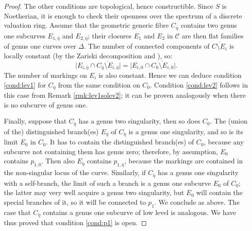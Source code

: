\documentclass{compositio}
\newcommand{\dvr}{\Delta}
\theoremstyle{plain}
\theoremstyle{definition}
\theoremstyle{remark}
\begin{document}
\begin{proof}
 The other conditions are topological, hence constructible. Since $S$ is Noetherian, it is enough to check their openness over the spectrum of a discrete valuation ring. Assume that the geometric generic fibre $C_{\bar\eta}$ contains two genus one subcurves $E_{1,\bar\eta}$ and $E_{2,\bar\eta}$; their closures $E_1$ and $E_2$ in $\mathcal C$ are then flat families of genus one curves over $\dvr$. %
 The number of connected components of $\overline {C\setminus E_i}$ is locally constant (by the Zariski decomposition and \cite[\href{https://stacks.math.columbia.edu/tag/0E0D}{Tag 0E0D}]{stacks-project}), so: \[\lvert E_{i,\bar\eta}\cap\overline{C_{\bar\eta}\setminus E_{i,\bar\eta}}\rvert=\lvert E_{i,0}\cap\overline{C_{0}\setminus E_{i,0}}\rvert.\]
 The number of markings on $E_i$ is also constant. Hence we can deduce condition \eqref{cond:lev1} for $C_{\bar\eta}$ from the same condition on $C_0$. Condition \eqref{cond:lev2} follows in this case from Remark \ref{rmk:lev1solev2}; it can be proven analogously when there is no subcurve of genus one.
 
 Finally, suppose that $C_{\bar\eta}$ has a genus two singularity, then so does $C_0$. The (union of the) distinguished branch(es) $E_{\bar\eta}$ of $C_{\bar\eta}$ is a genus one singularity, and so is its limit $E_0$ in $C_0$. It has to contain the distinguished branch(es) of $C_0$, because any subcurve not containing them has genus zero; therefore, by assumption, $E_0$ contains $p_{1,0}$. Then also $E_{\bar\eta}$ contains $p_{1,\bar\eta}$, because the markings are contained in the non-singular locus of the curve. Similarly, if $C_{\bar\eta}$ has a genus one singularity with a self-branch, the limit of such a branch is a genus one subcurve $E_0$ of $C_0$; the latter may very well acquire a genus two singularity, but $E_0$ will contain the special branches of it, so it will be connected to $p_1$. We conclude as above. The case that $C_{\bar\eta}$ contains a genus one subcurve of low level is analogous. We have thus proved that condition \eqref{cond:p1} is open.
\end{proof}
\end{document}
